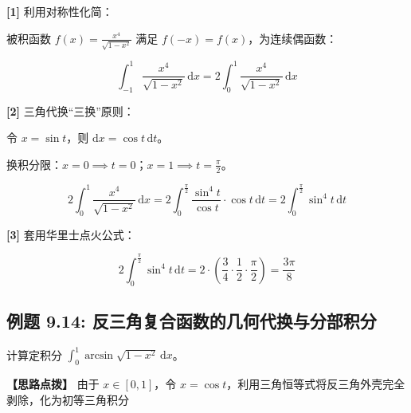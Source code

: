 \documentclass[11pt,a4paper,UTF8]{ctexart}
\begin{document}
\begin{solbox}[分步推导与答题规范]
\textbf{[1]} 利用对称性化简：

被积函数 $f(x) = \frac{x^4}{\sqrt{1-x^2}}$ 满足 $f(-x) = f(x)$，为连续偶函数：


\begin{equation*}
\int_{-1}^1 \frac{x^4}{\sqrt{1-x^2}}\,\mathrm{d}x = 2\int_0^1 \frac{x^4}{\sqrt{1-x^2}}\,\mathrm{d}x
\end{equation*}


\textbf{[2]} 三角代换“三换”原则：

令 $x = \sin t$，则 $\mathrm{d}x = \cos t\,\mathrm{d}t$。

换积分限：$x=0 \implies t=0$；$x=1 \implies t=\frac{\pi}{2}$。


\begin{equation*}
2\int_0^1 \frac{x^4}{\sqrt{1-x^2}}\,\mathrm{d}x = 2\int_0^{\frac{\pi}{2}} \frac{\sin^4 t}{\cos t} \cdot \cos t\,\mathrm{d}t = 2\int_0^{\frac{\pi}{2}} \sin^4 t\,\mathrm{d}t
\end{equation*}


\textbf{[3]} 套用华里士点火公式：


\begin{equation*}
2\int_0^{\frac{\pi}{2}} \sin^4 t\,\mathrm{d}t = 2 \cdot \left(\frac{3}{4} \cdot \frac{1}{2} \cdot \frac{\pi}{2}\right) = \frac{3\pi}{8}
\end{equation*}

\end{solbox}


\subsection{例题 9.14: 反三角复合函数的几何代换与分部积分}

计算定积分 $\int_0^1 \arcsin\sqrt{1-x^2}\,\mathrm{d}x$。

\textbf{\color{DeepPurple}【思路点拨】} 由于 $x \in [0, 1]$，令 $x = \cos t$，利用三角恒等式将反三角外壳完全剥除，化为初等三角积分
\end{document}
